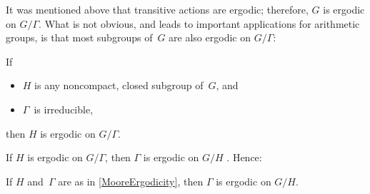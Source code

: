 It was mentioned above that transitive actions are ergodic; therefore, $G$ is ergodic on $G/\Gamma$.
What is not obvious, and leads to important applications for arithmetic groups, is that most subgroups of~$G$ are also ergodic on $G/\Gamma$:

\begin{thm} \label{MooreErgodicity}
If 
	\begin{itemize}
	\item $H$ is any noncompact, closed subgroup of~$G$, 
	and
	\item $\Gamma$~is irreducible,
	\end{itemize}
then $H$ is ergodic on $G/\Gamma$.
\end{thm}

If $H$ is ergodic on $G/\Gamma$, then $\Gamma$ is ergodic on $G/H$ . Hence:

\begin{cor} \label{GammaErgOnG/H}
If $H$ and\/~$\Gamma$ are as in \cref{MooreErgodicity},
then\/ $\Gamma$ is ergodic on $G/H$.
\end{cor}


